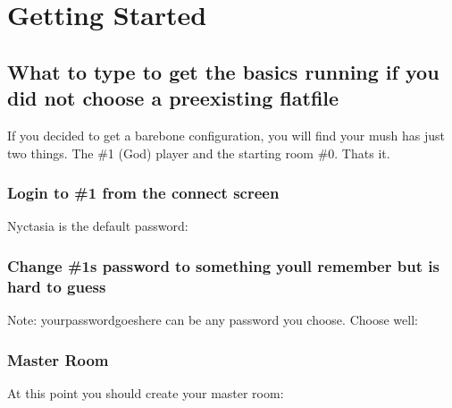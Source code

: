 \documentclass[letterpaper,10pt,english]{sphinxmanual}
\begin{document}
\chapter{Getting Started}
\label{\detokenize{gettingstarted:getting-started}}\label{\detokenize{gettingstarted::doc}}

\section{What to type to get the basics running if you did not choose a pre\sphinxhyphen{}existing flatfile}
\label{\detokenize{gettingstarted:what-to-type-to-get-the-basics-running-if-you-did-not-choose-a-pre-existing-flatfile}}
\sphinxAtStartPar
If you decided to get a bare\sphinxhyphen{}bone configuration, you will find your mush has just two things.  The \#1 (God) player and the starting room \#0.  That\textquotesingle{}s it.


\subsection{Login to \#1 from the connect screen}
\label{\detokenize{gettingstarted:login-to-1-from-the-connect-screen}}
\sphinxAtStartPar
Nyctasia is the default password:

\begin{sphinxVerbatim}[commandchars=\\\{\}]
 
\end{sphinxVerbatim}


\subsection{Change \#1\textquotesingle{}s password to something you\textquotesingle{}ll remember but is hard to guess}
\label{\detokenize{gettingstarted:change-1-s-password-to-something-you-ll-remember-but-is-hard-to-guess}}
\sphinxAtStartPar
Note: yourpasswordgoeshere can be any password you choose.  Choose well:

\begin{sphinxVerbatim}[commandchars=\\\{\}]
 
\end{sphinxVerbatim}


\subsection{Master Room}
\label{\detokenize{gettingstarted:master-room}}
\sphinxAtStartPar
At this point you should create your master room:
\end{document}
